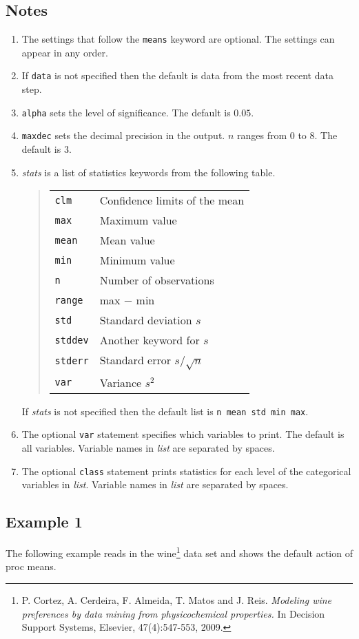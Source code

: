 \documentclass[12pt]{article}
\begin{document}
\subsection*{Notes}
\begin{enumerate}
\item
The settings that follow the {\tt means} keyword are optional.
The settings can appear in any order.
\item
If {\tt data} is not specified then the default is data from
the most recent data step.
\item
{\tt alpha} sets the level of significance.
The default is $0.05$.
\item
{\tt maxdec} sets the decimal precision in the output.
$n$ ranges from 0 to 8.
The default is 3.
\item
{\it stats} is a list of statistics keywords
from the following table.
\begin{quote}
\begin{tabular}{ll}
{\tt clm} & Confidence limits of the mean\\
{\tt max} & Maximum value\\
{\tt mean} & Mean value\\
{\tt min} & Minimum value\\
{\tt n} & Number of observations\\
{\tt range} & max $-$ min\\
{\tt std} & Standard deviation $s$\\
{\tt stddev} & Another keyword for $s$\\
{\tt stderr} & Standard error $s/\sqrt n$\\
{\tt var} & Variance $s^2$
\end{tabular}
\end{quote}
If {\it stats} is not specified then the default list is
{\tt n mean std min max}.
\item
The optional {\tt var} statement specifies which variables to print.
The default is all variables.
Variable names in {\it list} are separated by spaces.
\item
The optional {\tt class} statement prints statistics for each level
of the categorical variables in {\it list}.
Variable names in {\it list} are separated by spaces.
\end{enumerate}

\subsection*{Example 1}
The following example reads in the wine\footnote{
P. Cortez, A. Cerdeira, F. Almeida, T. Matos and J. Reis.
{\it Modeling wine preferences by data mining from physicochemical properties.}
In Decision Support Systems, Elsevier, 47(4):547-553, 2009.}
data set and shows the default action of proc means.
\end{document}
